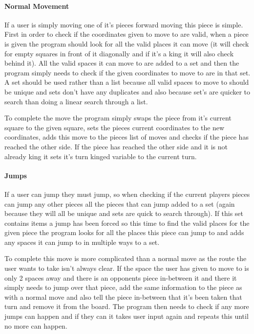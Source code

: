 \documentclass[10pt, a4paper]{article}
\begin{document}
    \paragraph{Normal Movement}
    If a  user is simply moving one of it's pieces forward moving this piece is simple. First in order to check if the coordinates given to move to are valid, when a piece is given the program should look for all the valid places it can move (it will check for empty squares in front of it diagonally and if it's a king it will also check behind it). All the valid spaces it can move to are added to a set and then the program simply needs to check if the given coordinates to move to are in that set. A set should be used rather than a list because all valid spaces to move to should be unique and sets don't have any duplicates and also because set's are quicker to search than doing a linear search through a list.
    
    To complete the move the program simply swaps the piece from it's current square to the given square, sets the pieces current coordinates to the new coordinates, adds this move to the pieces list of moves and checks if the piece has reached the other side. If the piece has reached the other side and it is not already king it sets it's turn kinged variable to the current turn.
    
    \paragraph{Jumps}
    If a user can jump they must jump, so when checking if the current players pieces can jump any other pieces all the pieces that can jump added to a set (again because they will all be unique and sets are quick to search through). If this set contains items a jump has been forced so this time to find the valid places for the given piece the program looks for all the places this piece can jump to and adds any spaces it can jump to in multiple ways to a set.
    
    To complete this move is more complicated than a normal move as the route the user wants to take isn't always clear. If the space the user has given to move to is only 2 spaces away and there is an opponents piece in-between it and there it simply needs to jump over that piece, add the same information to the piece as with a normal move and also tell the piece in-between that it's been taken that turn and remove it from the board. The program then needs to check if any more jumps can happen and if they can it takes user input again and repeats this until no more can happen.
    
\end{document}
